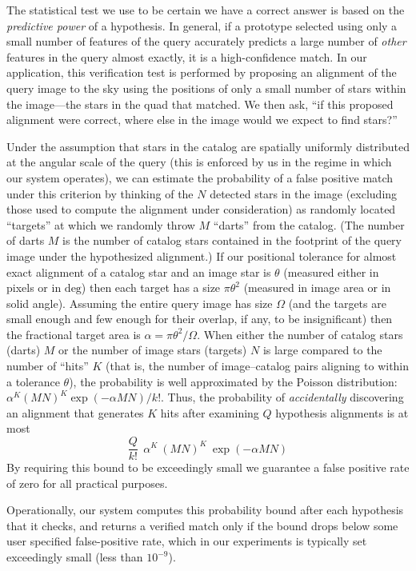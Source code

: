 \documentclass[12pt,preprint]{aastex}
\newcommand{\unit}[1]{\mathrm{#1}}
\renewcommand{\%}{\percent}
\renewcommand{\deg}{\unit{deg}}
\begin{document}
The statistical test we use to be certain we have a correct answer is
based on the \emph{predictive power} of a hypothesis. In general, if a
prototype selected using only a small number of features of the query
accurately predicts a large number of \emph{other} features in the
query almost exactly, it is a high-confidence match.  In our
application, this verification test is performed by proposing an
alignment of the query image to the sky using the positions of only a
small number of stars within the image---the stars in the quad that matched.
We then ask, ``if this
proposed alignment were correct, where else in the image would we
expect to find stars?''

Under the assumption that stars in the catalog are spatially uniformly
distributed at the angular scale of the query (this is enforced by us
in the regime in which our system operates), we can estimate the
probability of a false positive match under this criterion by thinking
of the $N$ detected stars in the image (excluding those used to
compute the alignment under consideration) as randomly located
``targets'' at which we randomly throw $M$ ``darts'' from the
catalog. (The number of darts $M$ is the number of catalog stars
contained in the footprint of the query image under the hypothesized
alignment.) If our positional tolerance for almost exact alignment of
a catalog star and an image star is $\theta$ (measured either in
pixels or in $\deg$) then each target has a size $\pi\theta^2$
(measured in image area or in solid angle). Assuming the entire query
image has size $\Omega$ (and the targets are small enough and few
enough for their overlap, if any, to be insignificant) then the
fractional target area is $\alpha=\pi\theta^2/\Omega$.  When either
the number of catalog stars (darts) $M$ or the number of image stars
(targets) $N$ is large compared to the number of ``hits'' $K$ (that
is, the number of image--catalog pairs aligning to within a tolerance
$\theta$), the probability is well approximated by the Poisson
distribution: $\alpha^K (MN)^K \exp(-\alpha M N)/k!$.  Thus, the
probability of \emph{accidentally} discovering an alignment that
generates $K$ hits after examining $Q$ hypothesis alignments is at
most
\begin{equation}
\frac{Q}{k!} \: \: \alpha^K \: (MN)^K \: \exp(-\alpha M N)
\end{equation}
By requiring this bound to be exceedingly small we guarantee a false
positive rate of zero for all practical purposes.

Operationally, our system computes this probability bound after
each hypothesis that it checks, and returns a verified match only if
the bound drops below some user specified false-positive rate, which
in our experiments is typically set exceedingly small (less than
$10^{-9}$).
\end{document}

